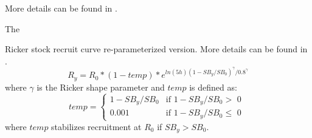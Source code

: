 More details can be found in \citet{punt-extending-2019}.

\hypertarget{Ricker2}{The} Ricker stock recruit curve re-parameterized version. More details can be found in \citet{punt-extending-2019}.
\begin{equation}
R_y = R_0*(1-temp)*e^{ln(5h)(1-SB_y/SB_0)^{\gamma}/0.8^{\gamma}}
\end{equation}
where $\gamma$ is the Ricker shape parameter and $temp$ is defined as:
\begin{equation}
temp = 
\begin{cases}
1-SB_y/SB_0 & \text{if $1-SB_y/SB_0 >$ 0 }\\
0.001 & \text{if $1-SB_y/SB_0 \leq$ 0}
\end{cases}		
\end{equation}
where $temp$ stabilizes recruitment at $R_0$ if $SB_y > SB_0$. 


